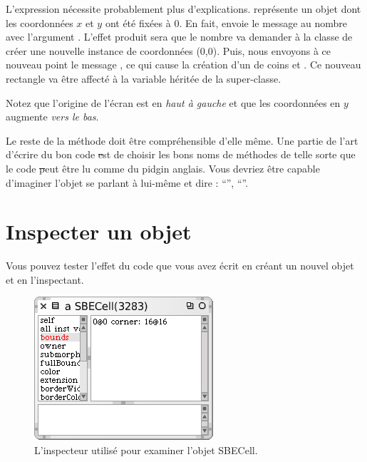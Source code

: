 \documentclass[a4paper,10pt,twoside]{book}
\begin{document}
L'expression  nécessite probablement plus d'explications.
 représente un objet  dont les coordonnées $x$ et $y$ ont été fixées à 0.
En fait,  envoie le message %
au nombre  avec l'argument .
L'effet produit sera que le nombre  va demander à la classe  de créer une nouvelle instance de coordonnées (0,0).
Puis, nous envoyons à ce nouveau point le message , ce qui cause la création d'un  de coins  et .
Ce nouveau rectangle va être affecté à la variable  héritée de la super-classe.

Notez que l'origine de l'écran \sq est en \emph{haut à gauche} et que les coordonnées en $y$ augmente \emph{vers le bas}.

Le reste de la méthode doit être compréhensible d'elle même.
Une partie de l'art d'écrire du bon code \st est de choisir les bons noms de méthodes de telle sorte que le code \st peut être lu comme du pidgin anglais.
Vous devriez être capable d'imaginer l'objet se parlant à lui-même et dire :  ``'', ``''.

\section{Inspecter un objet}

Vous pouvez tester l'effet du code que vous avez écrit en créant un nouvel objet  et en l'inspectant.


\begin{figure}[htbp]
   \centering
   \includegraphics[scale=0.7]{SBECellInspector} 
   \caption{L'inspecteur utilisé pour examiner l'objet SBECell.\label{fig:SBECellInspector}}
\end{figure}
\end{document}
